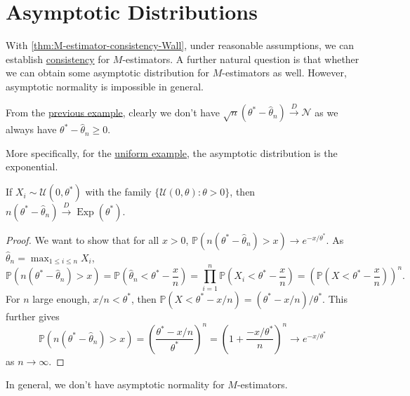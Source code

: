 \section{Asymptotic Distributions}
With \autoref{thm:M-estimator-consistency-Wall}, under reasonable assumptions, we can establish \hyperref[def:consistent]{consistency} for \(M\)-estimators. A further natural question is that whether we can obtain some asymptotic distribution for \(M\)-estimators as well. However, asymptotic normality is impossible in general.

\begin{eg}
	From the \hyperref[eg:uniform-MLE]{previous example}, clearly we don't have \(\sqrt{n} (\theta^{\ast} - \hat{\theta} _n) \overset{D}{\to} \mathcal{N} \) as we always have \(\theta ^{\ast} - \hat{\theta} _n \geq 0\).
\end{eg}

More specifically, for the \hyperref[eg:uniform-MLE]{uniform example}, the asymptotic distribution is the exponential.

\begin{proposition}\label{prop:uniform-MLE-asymptotic-distribution}
	If \(X_i \sim \mathcal{U} (0, \theta ^{\ast} )\) with the family \(\{\mathcal{U} (0, \theta ) \colon \theta > 0 \} \), then \(n (\theta ^{\ast} - \hat{\theta} _n) \overset{D}{\to} \operatorname{Exp}(\theta ^{\ast} )\).
\end{proposition}
\begin{proof}
	We want to show that for all \(x > 0\), \(\mathbb{P} (n(\theta ^{\ast} - \hat{\theta} _n) > x) \to e^{- x / \theta ^{\ast} }\). As \(\hat{\theta} _n = \max _{1 \leq i \leq n} X_i\),
	\[
		\mathbb{P} (n(\theta ^{\ast} - \hat{\theta} _n) > x)
		= \mathbb{P} \left( \hat{\theta} _n <\theta ^{\ast} - \frac{x}{n} \right)
		= \prod_{i=1}^{n} \mathbb{P} \left( X_i < \theta ^{\ast} - \frac{x}{n} \right)
		= \left( \mathbb{P} \left( X < \theta ^{\ast} - \frac{x}{n} \right) \right) ^n.
	\]
	For \(n\) large enough, \(x / n < \theta ^{\ast} \), then \(\mathbb{P} (X < \theta ^{\ast} - x / n) = (\theta ^{\ast} - x / n) / \theta ^{\ast} \). This further gives
	\[
		\mathbb{P} (n(\theta ^{\ast} - \hat{\theta} _n) > x)
		= \left( \frac{\theta ^{\ast} - x / n}{\theta ^{\ast} } \right) ^n
		= \left( 1 + \frac{- x / \theta ^{\ast} }{n} \right) ^n
		\to e^{- x / \theta ^{\ast} }
	\]
	as \(n \to \infty \).
\end{proof}

\begin{remark}
	In general, we don't have asymptotic normality for \(M\)-estimators.
\end{remark}

